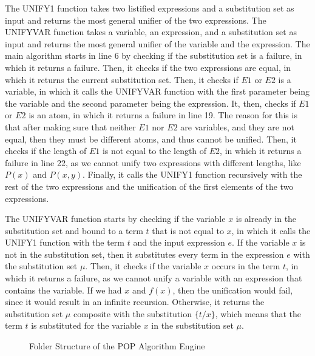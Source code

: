The UNIFY1 function takes two listified expressions and a substitution set as input and returns the most general unifier of the two expressions. The UNIFYVAR function takes a variable, an expression, and a substitution set as input and returns the most general unifier of the variable and the expression. The main algorithm starts in line 6 by checking if the substitution set is a failure, in which it returns a failure. Then, it checks if the two expressions are equal, in which it returns the current substitution set. Then, it checks if $E1$ or $E2$ is a variable, in which it calls the UNIFYVAR function with the first parameter being the variable and the second parameter being the expression. It, then, checks if $E1$ or $E2$ is an atom, in which it returns a failure in line 19. The reason for this is that after making sure that neither $E1$ nor $E2$ are variables, and they are not equal, then they must be different atoms, and thus cannot be unified. Then, it checks if the length of $E1$ is not equal to the length of $E2$, in which it returns a failure in line 22, as we cannot unify two expressions with different lengths, like $P(x)$ and $P(x, y)$. Finally, it calls the UNIFY1 function recursively with the rest of the two expressions and the unification of the first elements of the two expressions.

The UNIFYVAR function starts by checking if the variable $x$ is already in the substitution set and bound to a term $t$ that is not equal to $x$, in which it calls the UNIFY1 function with the term $t$ and the input expression $e$. If the variable $x$ is not in the substitution set, then it substitutes every term in the expression $e$ with the substitution set $\mu$. Then, it checks if the variable $x$ occurs in the term $t$, in which it returns a failure, as we cannot unify a variable with an expression that contains the variable. If we had $x$ and $f(x)$, then the unification would fail, since it would result in an infinite recursion.
Otherwise, it returns the substitution set $\mu$ composite with the substitution $\{t/x\}$, which means that the term $t$ is substituted for the variable $x$ in the substitution set $\mu$.

\begin {figure}[h]
\caption{Folder Structure of the POP Algorithm Engine}
\label{fig:pop_folder_structure}
\end{figure}


